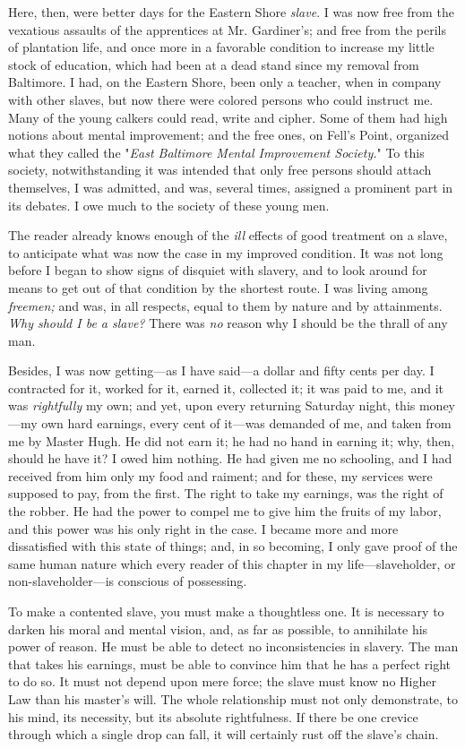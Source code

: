 Here, then, were better days for the Eastern Shore \emph{slave}. I was
now free from the vexatious assaults of {}the apprentices at Mr.
Gardiner's; and free from the perils of plantation life, and once more
in a favorable condition to increase my little stock of education, which
had been at a dead stand since my removal from Baltimore. I had, on the
Eastern Shore, been only a teacher, when in company with other slaves,
but now there were colored persons who could instruct me. Many of the
young calkers could read, write and cipher. Some of them had high
notions about mental improvement; and the free ones, on Fell's Point,
organized what they called the "\emph{East Baltimore Mental Improvement
Society.}" To this society, notwithstanding it was intended that only
free persons should attach themselves, I was admitted, and was, several
times, assigned a prominent part in its debates. I owe much to the
society of these young men.

The reader already knows enough of the \emph{ill} effects of good
treatment on a slave, to anticipate what was now the case in my improved
condition. It was not long before I began to show signs of disquiet with
slavery, and to look around for means to get out of that condition by
the shortest route. I was living among \emph{freemen;} and was, in all
respects, equal to them by nature and by attainments. \emph{Why should I
be a slave?} There was \emph{no} reason why I should be the thrall of
any man.

Besides, I was now getting---as I have said---a dollar and fifty cents
per day. I contracted for it, worked for it, earned it, collected it; it
was paid to me, and it was \emph{rightfully} my own; and yet, upon every
returning Saturday night, this money---my {}own hard earnings, every
cent of it---was demanded of me, and taken from me by Master Hugh. He
did not earn it; he had no hand in earning it; why, then, should he have
it? I owed him nothing. He had given me no schooling, and I had received
from him only my food and raiment; and for these, my services were
supposed to pay, from the first. The right to take my earnings, was the
right of the robber. He had the power to compel me to give him the
fruits of my labor, and this power was his only right in the case. I
became more and more dissatisfied with this state of things; and, in so
becoming, I only gave proof of the same human nature which every reader
of this chapter in my life---slaveholder, or non-slaveholder---is
conscious of possessing.

To make a contented slave, you must make a thoughtless one. It is
necessary to darken his moral and mental vision, and, as far as
possible, to annihilate his power of reason. He must be able to detect
no inconsistencies in slavery. The man that takes his earnings, must be
able to convince him that he has a perfect right to do so. It must not
depend upon mere force; the slave must know no Higher Law than his
master's will. The whole relationship must not only demonstrate, to his
mind, its necessity, but its absolute rightfulness. If there be one
crevice through which a single drop can fall, it will certainly rust off
the slave's chain.
